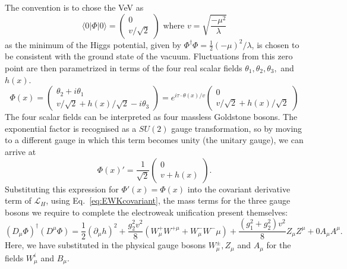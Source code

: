The convention is to chose the \ac{VeV} as 
\begin{equation}
\langle 0 | \Phi | 0 \rangle = \left(  
\begin{array}{c}
0 \\
v/\sqrt{2}
\end{array} \right)
\text{ where }
v = \sqrt{\frac{- \mu^{2}}{\lambda}}
\end{equation}
as the minimum of the Higgs potential, given by $\Phi^{\dag} \Phi = \frac{1}{2} (- \mu)^{2}/\lambda$, 
is chosen to be consistent with the ground state of the vacuum.
Fluctuations from this zero point are then parametrized in terms of the four real scalar fields $\theta_{1} , \theta_{2} ,\theta_{3},$ and $h(x)$.
%
\begin{equation}
\Phi(x) = \left(  
\begin{array}{c}
\theta_{2} + i \theta_{1} \\
v/ \sqrt{2} + h(x)/ \sqrt{2} - i \theta_{3}
\end{array} \right)
= e^{i \tau \cdot \theta(x)/v}
 \left(  
 \begin{array}{c}
 0 \\
 v/\sqrt{2} + h(x)/\sqrt{2} 
 \end{array} 
 \right)
\end{equation}
%
The four scalar fields can be interpreted as four massless Goldstone bosons.
The exponential factor is recognised as a $SU(2)$ gauge transformation, so by moving to a different gauge in which this term becomes unity (the unitary gauge), we can arrive at
\begin{equation}
\Phi(x)' = \frac{1}{\sqrt{2}}
 \left(  
 \begin{array}{c}
 0 \\
 v + h(x) 
 \end{array} 
 \right).
 \label{eq:unitaryGauge}
\end{equation}
Substituting this expression for $\Phi'(x) = \Phi(x)$ into the covariant derivative term of $\mathcal{L}_{H}$, using Eq.~\ref{eq:EWKcovariant}, 
the mass terms for the three gauge bosons we require to complete the electroweak unification present themselves:
\begin{equation}
(D_{\mu}\Phi)^{\dag}(D^{\mu}\Phi) = \frac{1}{2}(\partial_{\mu}h)^{2} + \frac{g_{2}^{2}v^{2}}{8}\left( W^{+}_{\mu}W^{+\mu} + W^{-}_{\mu}W^-{\mu} \right)+ \frac{(g_{1}^{2}+g_{2}^{2})v^{2}}{8}Z_{\mu}Z^{\mu} + 0 A_{\mu}A^{\mu}.
\label{eq:covariantWithHiggsMech}
\end{equation}
Here, we have substituted in the physical gauge bosons $W^{\pm}_{\mu}, Z_{\mu}$ and $A_{\mu}$ for the fields $W^{i}_{\mu}$ and $B_{\mu}$.
